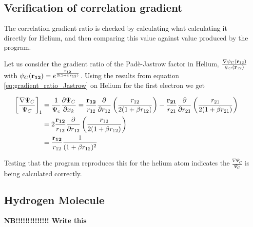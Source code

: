 		\subsection{Verification of correlation gradient}
			The correlation gradient ratio is checked by calculating what calculating it directly for Helium, and then comparing this value against value produced by the program.

			Let us consider the gradient ratio of the Padè-Jastrow factor in Helium, \(\frac{\nabla\psi_C(\vb{r}_{12})}{\psi_C(\vb{r}_{12})}\) with \(\psi_C(\vb{r_{12}}) = e^{\frac{r_{12}}{2(1+\beta r_{12})}}\). Using the results from equation \eqref{eq:gradient_ratio_Jastrow} on Helium for the first electron we get

			\begin{align}
				\left[\frac{\nabla\Psi_C}{\Psi_C} \right]_1 &= \frac{1}{\Psi_c} \pdv{\Psi_C}{x_k} = \frac{\vb{r_{12}}}{r_{12}}\pdv{}{r_{12}}\left( \frac{r_{12}}{2(1+\beta r_{12})} \right) - \frac{\vb{r_{21}}}{r_{21}}\pdv{}{r_{21}}\left( \frac{r_{21}}{2(1+\beta r_{21})} \right)
				\\
				&= 2\frac{\vb{r_{12}}}{r_{12}}\pdv{}{r_{12}}\left( \frac{r_{12}}{2(1+\beta r_{12})} \right)
				\\
				&= \frac{\vb{r_{12}}}{r_{12}} \frac{1}{(1+\beta r_{12})^2}
			\end{align}

			Testing that the program reproduces this for the helium atom indicates the \(\frac{\nabla \Psi_C}{\Psi_C}\) is being calculated correctly.

		\subsection{Hydrogen Molecule}
			\textbf{NB!!!!!!!!!!!!!! Write this}\\
